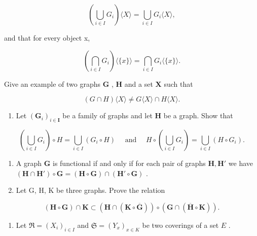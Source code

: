 \[
\left(\bigcup_ {i \in I} G _ {i}\right) \langle X \rangle = \bigcup_ {i \in I} G _ {i} \langle X \rangle ,
\]

and that for every object x,

\[
\left(\bigcap_ {i \in I} G _ {i}\right) \langle \{x \} \rangle = \bigcap_ {i \in I} G _ {i} \langle \{x \} \rangle .
\]

Give an example of two graphs \(\mathbf{G}\) , \(\mathbf{H}\) and a set \(\mathbf{X}\) such that

\[
(G \cap H) \langle X \rangle \neq G \langle X \rangle \cap H \langle X \rangle .
\]

\begin{enumerate}
\def\labelenumi{\arabic{enumi}.}
\setcounter{enumi}{4}
\tightlist
\item
  Let \((\mathbf{G}_i)_{i\in \mathbf{I}}\) be a family of graphs and let \(\mathbf{H}\) be a graph. Show that
\end{enumerate}

\[
\left(\bigcup_ {i \in I} G _ {i}\right) \circ H = \bigcup_ {i \in I} (G _ {i} \circ H) \quad \text { and } \quad H \circ \left(\bigcup_ {i \in I} G _ {i}\right) = \bigcup_ {i \in I} (H \circ G _ {i}).
\]

\begin{enumerate}
\def\labelenumi{\arabic{enumi}.}
\setcounter{enumi}{5}
\item
  A graph \(\mathbf{G}\) is functional if and only if for each pair of graphs \(\mathbf{H}, \mathbf{H}'\) we have \((\mathbf{H} \cap \mathbf{H}') \circ \mathbf{G} = (\mathbf{H} \circ \mathbf{G}) \cap (\mathbf{H}' \circ \mathbf{G})\) .
\item
  Let G, H, K be three graphs. Prove the relation
\end{enumerate}

\[
(\mathbf {H} \circ \mathbf {G}) \cap \mathbf {K} \subset (\mathbf {H} \cap (\mathbf {K} \circ \overline {{\mathbf {G}}})) \circ (\mathbf {G} \cap (\overline {{\mathbf {H}}} \circ \mathbf {K})).
\]

\begin{enumerate}
\def\labelenumi{\arabic{enumi}.}
\setcounter{enumi}{7}
\tightlist
\item
  Let \(\Re = (X_{i})_{i\in I}\) and \(\mathfrak{S} = (Y_x)_{x\in K}\) be two coverings of a set \(E\) .
\end{enumerate}

